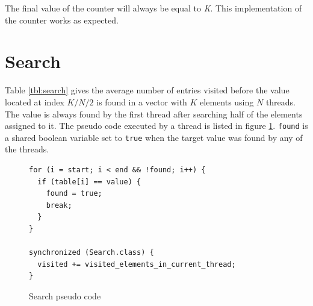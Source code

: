 \documentclass[12pt]{article}
\begin{document}
The final value of the counter will always be equal to \emph{K}. This
implementation of the counter works as expected.


\newpage
\section{Search}

\begin{table}[h!]
  \centering
  \small

  \caption{Number of visited entries for variable N and K = 100.000.000 on a 4 logical
  cores processor. Reported values are averaged over 7 runs.}
  \label{tbl:search}
\end{table}

Table \ref{tbl:search} gives the average number of entries visited before the
value located at index $K / N / 2$ is found in a vector with $K$ elements
using $N$ threads. The value is always found by the first thread after
searching half of the elements assigned to it. The pseudo code executed by
a thread is listed in figure \ref{fig:search-pseudocode}. \texttt{found}
is a shared boolean variable set to \texttt{true} when the target value was
found by any of the threads.

\begin{figure}[h!]
  \begin{Verbatim}[frame=single]
for (i = start; i < end && !found; i++) {                                    
  if (table[i] == value) {                                                   
    found = true;                                                            
    break;                                                                   
  }                                                                          
}                                                                            
                                                                             
synchronized (Search.class) {                                                
  visited += visited_elements_in_current_thread;
}
  \end{Verbatim}
  \caption{Search pseudo code}
  \label{fig:search-pseudocode}
\end{figure}
\end{document}
